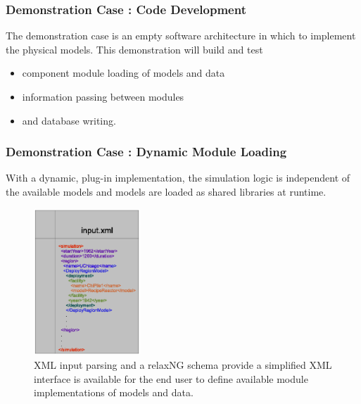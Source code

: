 
\begin{frame}[ctb!]
  \frametitle{Demonstration Case : Code Development}
  The demonstration case is an empty software architecture in which to implement 
  the physical models. This demonstration will build and test
  \begin{itemize}
    \item component module loading of models and data
    \item information passing between modules
    \item and database writing.
  \end{itemize}
\end{frame}

\begin{frame}[ctb!]
  \frametitle{Demonstration Case : Dynamic Module Loading}
  With a dynamic, plug-in implementation, the simulation logic is 
  independent of the available models and models are loaded as shared 
  libraries at runtime. 

  \begin{figure}[htbp!]
    \begin{center}
      \includegraphics[height=5.5cm]{user.eps}
    \end{center}
    \caption { XML input parsing and a relaxNG schema provide 
    a simplified XML interface is available for the end
    user to define available module implementations of models and data. }
    \label{fig:xmlinput}
  \end{figure}

\end{frame}

